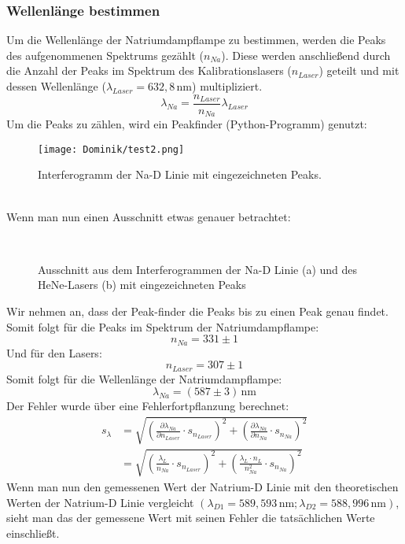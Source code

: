 \subsubsection{Wellenlänge bestimmen}
Um die Wellenlänge der Natriumdampflampe zu bestimmen, werden die Peaks des aufgenommenen Spektrums gezählt ($n_{Na}$).
Diese werden anschließend durch die Anzahl der Peaks im Spektrum des Kalibrationslasers ($n_{Laser}$) geteilt und mit dessen Wellenlänge ($\lambda_{Laser}=632,8\,\text{nm}$) multipliziert.
\begin{equation}
    \lambda_{Na}=\frac{n_{Laser}}{n_{Na}}\lambda_{Laser}
\end{equation}\newpage
Um die Peaks zu zählen, wird ein Peakfinder (Python-Programm) genutzt:
\begin{figure}[h]
    \centering\texttt{[image: Dominik/test2.png]}
    \caption{Interferogramm der Na-D Linie mit eingezeichneten Peaks.}
\end{figure}\\
Wenn man nun einen Ausschnitt etwas genauer betrachtet:
\begin{figure}[h]
    \centering\subfigure[Na-D Linie]{\scalebox{0.7}{}}\\
    \caption{Ausschnitt aus dem Interferogrammen der Na-D Linie (a) und des HeNe-Lasers (b) mit eingezeichneten Peaks}
\end{figure}\newpage
Wir nehmen an, dass der Peak-finder die Peaks bis zu einen Peak genau findet.
Somit folgt für die Peaks im Spektrum der Natriumdampflampe:
\begin{equation}
    n_{Na}=331\pm1
\end{equation}
Und für den Lasers:
\begin{equation}
    n_{Laser}=307\pm1
\end{equation}
Somit folgt für die Wellenlänge der Natriumdampflampe:
\begin{equation}
    \lambda_{Na}=\left(587\pm3\right)\,\text{nm}
\end{equation}
Der Fehler wurde über eine Fehlerfortpflanzung berechnet:
\begin{align}
    s_{\lambda} &= \sqrt{\left(\frac{\partial \lambda_{Na}}{\partial n_{Laser}}\cdot s_{n_{Laser}}\right)^2+ \left(\frac{\partial \lambda_{Na}}{\partial n_{Na}}\cdot s_{n_{Na}}\right)^2}\\
                &= \sqrt{\left(\frac{\lambda_L}{n_{Na}} \cdot s_{n_{Laser}}\right)^2 + \left(\frac{\lambda_L \cdot n_L}{n^2_{Na}} \cdot s_{n_{Na}}\right)^2 }
\end{align}
Wenn man nun den gemessenen Wert der Natrium-D Linie mit den theoretischen Werten der Natrium-D Linie vergleicht $(\lambda_{D1}=589,593\,\text{nm}; \lambda_{D2}=588,996\,\text{nm})$, sieht man das der gemessene Wert mit seinen Fehler die tatsächlichen Werte einschließt.


